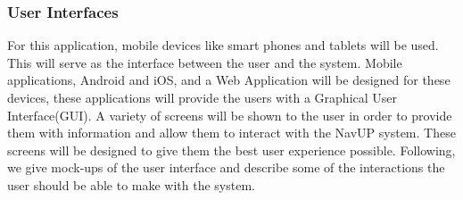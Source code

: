 \documentclass[a4paper,12pt]{article}
\begin{document}
\subsubsection{User Interfaces}
For this application, mobile devices like smart phones and tablets will be used. This will serve as the interface between the user and the system. Mobile applications, Android and iOS, and a Web Application will be designed for these devices, these applications will provide the users with a Graphical User Interface(GUI). A variety of screens will be shown to the user in order to provide them with information and allow them to interact with the NavUP system. These screens will be designed to give them the best user experience possible. Following, we give mock-ups of the user interface and describe some of the interactions the user should be able to make with the system. 
\end{document}
